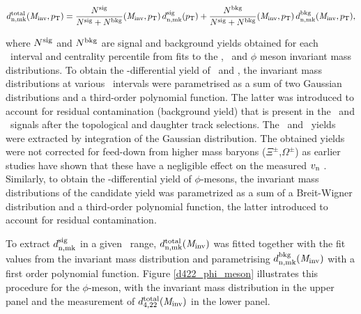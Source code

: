 \begin{equation}
d_{\rm n,mk}^{\rm total}({\it M}_{\rm inv}, p_{\rm T}) = \frac{N^{\rm sig}}{N^{\rm sig}+N^{\rm bkg}}({\it M}_{\rm inv}, p_{\rm T})\,d_{\rm n,mk}^{\rm sig}(p_{\rm T})+\frac{N^{\rm bkg}}{N^{{\rm sig}}+N^{{\rm bkg}}}({\it M}_{\rm inv}, p_{\rm T})\,d_{\rm n,mk}^{\rm bkg}({\it M}_{\rm inv}, p_{\rm T}),
\label{Eq:dnmk}
\end{equation}

where $N^{\rm{sig}}$ and $N^{\rm{bkg}}$ are signal and background yields obtained for each \pT~interval and centrality percentile from fits to the \Ks, \lambdas~and $\phi$ meson invariant mass distributions. To obtain the \pT-differential yield of \Ks~and \lambdas, the invariant mass distributions at various \pT~intervals were parametrised as a sum of two Gaussian distributions and a third-order polynomial function. The latter was introduced to account for residual contamination (background yield) that is present in the \Ks~and \lambdas~signals after the topological and daughter track selections. The \Ks~and \lambdas~yields were extracted by integration of the Gaussian distribution. The obtained yields were not corrected for feed-down from higher mass baryons ($\Xi^{\pm}$,$\Omega^{\pm}$) as earlier studies have shown that these have a negligible effect on the measured $v_{\rm n}$ \cite{Abelev:2014pua}. Similarly, to obtain the \pT-differential yield of $\phi$-mesons, the invariant mass distributions of the candidate yield was parametrized as a sum of a Breit-Wigner distribution and a third-order polynomial function, the latter introduced to account for residual contamination.

To extract $d_{\rm n,mk}^{\rm{sig}}$ in a given \pT~range, $d_{\rm n,mk}^{\rm total}({\it M}_{\rm inv})$ was fitted together with the fit values from the invariant mass distribution and parametrising $d_{\rm n,mk}^{\rm{bkg}}({\it M}_{\rm inv})$ with a first order polynomial function. Figure \ref{d422_phi_meson} illustrates this procedure for the $\phi$-meson, with the invariant mass distribution in the upper panel and the measurement of $d_{4,22}^{\rm total}({\it M}_{\rm inv})$ in the lower panel. 


